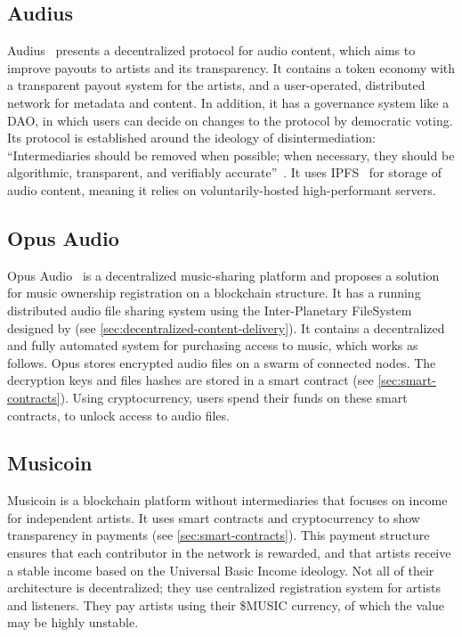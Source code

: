 \subsection{Audius}
Audius~\citep{audius2018} presents a decentralized protocol for audio content, which aims to improve payouts to artists and its transparency. It contains a token economy with a transparent payout system for the artists, and a user-operated, distributed network for metadata and content. In addition, it has a governance system like a DAO, in which users can decide on changes to the protocol by democratic voting. Its protocol is established around the ideology of disintermediation: ``Intermediaries  should  be  removed  when  possible; when necessary, they should be algorithmic, transparent, and verifiably accurate''~\citep{audius2018}. It uses IPFS~\citep{benet2014ipfs} for storage of audio content, meaning it relies on voluntarily-hosted high-performant servers.

\subsection{Opus Audio}
Opus Audio~\citep{jia2016opus} is a decentralized music-sharing platform and proposes a solution for music ownership registration on a blockchain structure. It has a running distributed audio file sharing system using the Inter-Planetary FileSystem designed by \cite{benet2014ipfs} (see \ref{sec:decentralized-content-delivery}). It contains a decentralized and fully automated system for purchasing access to music, which works as follows. Opus stores encrypted audio files on a swarm of connected nodes. The decryption keys and files hashes are stored in a smart contract (see \ref{sec:smart-contracts}). Using cryptocurrency, users spend their funds on these smart contracts, to unlock access to audio files.

\subsection{Musicoin}
Musicoin is a blockchain platform without intermediaries that focuses on income for independent artists. It uses smart contracts and cryptocurrency to show transparency in payments (see \ref{sec:smart-contracts}). This payment structure ensures that each contributor in the network is rewarded, and that artists receive a stable income based on the Universal Basic Income ideology. Not all of their architecture is decentralized; they use centralized registration system for artists and listeners. They pay artists using their \$MUSIC currency, of which the value may be highly unstable.

